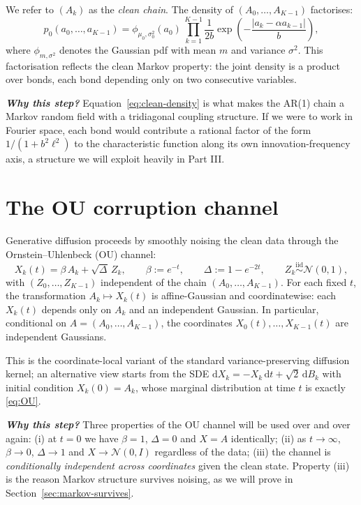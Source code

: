\documentclass[11pt,a4paper,openany]{book}
\theoremstyle{plainserif}
\theoremstyle{definition}
\theoremstyle{remarkstyle}
\newenvironment{whybox}{%
  \begin{center}\begin{minipage}{0.95\linewidth}\small
  \textbf{\textit{Why this step?}}\quad\ignorespaces}{%
  \end{minipage}\end{center}}
\newcommand{\Normal}{\mathcal{N}}
\begin{document}
We refer to $(A_k)$ as the \emph{clean chain}. The density of
$(A_0, \ldots, A_{K-1})$ factorises:
\begin{equation}
p_0(a_0, \ldots, a_{K-1}) = \phi_{\mu_0,\sigma_0^2}(a_0)\,
\prod_{k=1}^{K-1} \frac{1}{2b}\exp\!\left(-\frac{|a_k - \alpha a_{k-1}|}{b}\right),
\label{eq:clean-density}
\end{equation}
where $\phi_{m,\sigma^2}$ denotes the Gaussian pdf with mean $m$ and
variance $\sigma^2$. This factorisation reflects the clean Markov property:
the joint density is a product over bonds, each bond depending only on two
consecutive variables.

\begin{whybox}
  Equation~\eqref{eq:clean-density} is what makes the AR(1) chain a
  Markov random field with a tridiagonal coupling structure. If we were
  to work in Fourier space, each bond would contribute a rational factor
  of the form $1/(1 + b^2 \ell^2)$ to the characteristic function along
  its own innovation-frequency axis, a structure we will exploit
  heavily in Part III.
\end{whybox}

\section{The OU corruption channel}

Generative diffusion proceeds by smoothly noising the clean data through
the Ornstein--Uhlenbeck (OU) channel:
\begin{equation}
X_k(t) = \beta\, A_k + \sqrt{\Delta}\, Z_k,\qquad
\beta := e^{-t},\qquad \Delta := 1 - e^{-2t},\qquad
Z_k \stackrel{\mathrm{iid}}{\sim} \Normal(0, 1),
\label{eq:OU}
\end{equation}
with $(Z_0, \ldots, Z_{K-1})$ independent of the chain
$(A_0, \ldots, A_{K-1})$. For each fixed $t$, the transformation
$A_k \mapsto X_k(t)$ is affine-Gaussian and coordinatewise: each
$X_k(t)$ depends only on $A_k$ and an independent Gaussian. In
particular, conditional on $A = (A_0, \ldots, A_{K-1})$, the
coordinates $X_0(t), \ldots, X_{K-1}(t)$ are independent Gaussians.

This is the coordinate-local variant of the standard variance-preserving
diffusion kernel; an alternative view starts from the SDE
$\mathrm{d}X_k = -X_k\,\mathrm{d}t + \sqrt{2}\,\mathrm{d}B_k$ with
initial condition $X_k(0)=A_k$, whose marginal distribution at time $t$
is exactly \eqref{eq:OU}.

\begin{whybox}
Three properties of the OU channel will be used over and over again:
(i) at $t=0$ we have $\beta=1$, $\Delta=0$ and $X=A$ identically;
(ii) as $t\to\infty$, $\beta \to 0$, $\Delta\to 1$ and $X \to \Normal(0,I)$
regardless of the data;
(iii) the channel is \emph{conditionally independent across coordinates}
given the clean state.
Property (iii) is the reason Markov structure survives noising, as we
will prove in Section~\ref{sec:markov-survives}.
\end{whybox}
\end{document}

